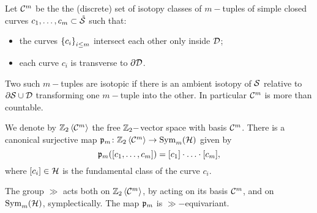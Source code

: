 \begin{defn}
\label{defn:cCm}
Let $\cC^m$ be the the (discrete) set of isotopy classes of $m-$tuples of simple closed curves $c_1,\dots,c_m\subset\mrS$
such that:
\begin{itemize}
 \item the curves $\set{c_i}_{i\leq m}$ intersect each other only inside $\D$;
 \item each curve $c_i$ is transverse to $\partial\D$.
\end{itemize}
Two such $m-$tuples are isotopic if there is an ambient isotopy of $\S$ relative to $\partial\S\cup\D$
transforming one $m-$tuple into the other. In particular $\cC^m$ is more than countable.

We denote by $\ZcC{m}$ the free $\Z_2-$vector space with basis $\cC^m$.
There is a canonical surjective map $\pr_m\colon\ZcC{m}\to\Sym_m(\H)$ given by
\[
 \pr_m([c_1,\dots,c_m])=[c_1]\cdot\ldots\cdot[c_m],
\]
where $[c_i]\in\H$ is the fundamental class of the curve $c_i$.

The group $\gg$ acts both on $\ZcC{m}$, by acting on its basis $\cC^m$, and
on $\Sym_m(\H)$, symplectically. The map $\pr_m$ is $\gg-$equivariant.
\end{defn}

